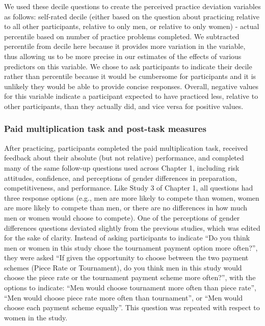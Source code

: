 \documentclass[letterpaper, nobind]{templates/ociamthesis}
\begin{document}
We used these decile questions to create the perceived practice deviation variables as follows: self-rated decile (either based on the question about practicing relative to all other participants, relative to only men, or relative to only women) - actual percentile based on number of practice problems completed. We subtracted percentile from decile here because it provides more variation in the variable, thus allowing us to be more precise in our estimates of the effects of various predictors on this variable. We chose to ask participants to indicate their decile rather than percentile because it would be cumbersome for participants and it is unlikely they would be able to provide concise responses. Overall, negative values for this variable indicate a participant expected to have practiced less, relative to other participants, than they actually did, and vice versa for positive values.

\hypertarget{paid-multiplication-task-and-post-task-measures}{%
\subsubsection{Paid multiplication task and post-task measures}\label{paid-multiplication-task-and-post-task-measures}}

After practicing, participants completed the paid multiplication task, received feedback about their absolute (but not relative) performance, and completed many of the same follow-up questions used across Chapter 1, including risk attitudes, confidence, and perceptions of gender differences in preparation, competitiveness, and performance. Like Study 3 of Chapter 1, all questions had three response options (e.g., men are more likely to compete than women, women are more likely to compete than men, or there are no differences in how much men or women would choose to compete). One of the perceptions of gender differences questions deviated slightly from the previous studies, which was edited for the sake of clarity. Instead of asking participants to indicate ``Do you think men or women in this study chose the tournament payment option more often?'', they were asked ``If given the opportunity to choose between the two payment schemes (Piece Rate or Tournament), do you think men in this study would choose the piece rate or the tournament payment scheme more often?'', with the options to indicate: ``Men would choose tournament more often than piece rate'', ``Men would choose piece rate more often than tournament'', or ``Men would choose each payment scheme equally''. This question was repeated with respect to women in the study.
\end{document}

